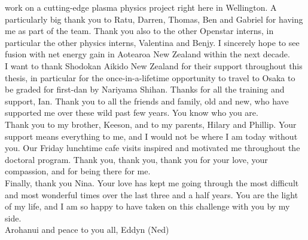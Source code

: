 \documentclass[
  a4paper,
]{scrbook}
\renewcommand*\contentsname{Table of contents}
\newcommand\contentsname{Table of contents}
\begin{document}
work on a cutting-edge plasma physics project right here in Wellington. A particularly big thank you to Ratu, Darren, Thomas, Ben and Gabriel for having me as part of the team. Thank you also to the other Openstar interns, in particular the other physics interns, Valentina and Benjy. I sincerely hope to see fusion with net energy gain in Aotearoa New Zealand within the next decade. \\[5pt] I want to thank Shodokan Aikido New Zealand for their support throughout this thesis, in particular for the once-in-a-lifetime opportunity to travel to Osaka to be graded for first-dan by Nariyama Shihan. Thanks for all the training and support, Ian. Thank you to all the friends and family, old and new, who have supported me over these wild past few years. You know who you are. \\[5pt] Thank you to my brother, Keeson, and to my parents, Hilary and Phillip. Your support means everything to me, and I would not be where I am today without you. Our Friday lunchtime cafe visits inspired and motivated me throughout the doctoral program. Thank you, thank you, thank you for your love, your compassion, and for being there for me. \\[5pt] Finally, thank you Nina. Your love has kept me going through the most difficult and most wonderful times over the last three and a half years. You are the light of my life, and I am so happy to have taken on this challenge with you by my side. \\[5pt] Arohanui and peace to you all, Eddyn (Ned)

\fancyhf{} %
\thispagestyle{fancy} %
\renewcommand{\headrulewidth}{0pt}
\fancyfoot[R]{\thepage} %

\clearpage
\newpage
\thispagestyle{empty} %
\mbox{~}
\clearpage
\newpage

\pagestyle{headings}

\ifdefined\Shaded\renewenvironment{Shaded}{\begin{tcolorbox}[enhanced, borderline west={3pt}{0pt}{shadecolor}, interior hidden, frame hidden, breakable, sharp corners, boxrule=0pt]}{\end{tcolorbox}}\fi

\renewcommand*\contentsname{Table of Contents}
{
\setcounter{tocdepth}{2}
\tableofcontents
}
\listoffigures
{}
\listoftables
{}
\end{document}
